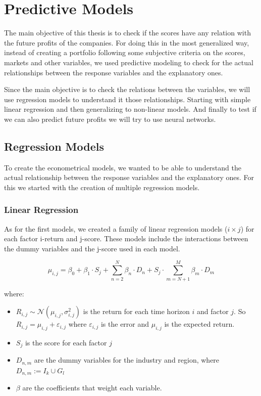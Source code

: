 \documentclass[11pt,english,a4paper,hidelinks]{book}
\begin{document}
\section{Predictive Models}
The main objective of this thesis is to check if the scores have any relation with the future profits of the companies. For doing this in the most generalized way, instead of creating a portfolio following some subjective criteria on the scores, markets and other variables, we used predictive modeling to check for the actual relationships between the response variables and the explanatory ones.

\vspace{0.5cm}
\noindent Since the main objective is to check the relations between the variables, we will use regression models to understand it those relationships. Starting with simple linear regression and then generalizing to non-linear models. And finally to test if we can also predict future profits we will try to use neural networks.


\subsection{Regression Models}

To create the econometrical models, we wanted to be able to understand the actual relationship between the response variables and the explanatory ones. For this we started with the creation of multiple regression models.

\subsubsection{Linear Regression}

As for the first models, we created a family of linear regression models (\(i \times j\)) for each factor i-return and j-score. These models include the interactions between the dummy variables and the j-score used in each model.

\begin{equation}
    \mu_{i,j} = \beta_0+\beta_1 \cdot S_j + 
\sum_{n=2}^{N}\beta_{n}\cdot D_n + S_j \cdot \sum_{m=N+1}^{M}\beta_{m}\cdot D_m
\end{equation}

\noindent where:
\begin{itemize}
    \item  \(R_{i,j} \sim \mathcal{N}(\mu_{i,j}, \sigma_{i,j}^2)\) is the return for each time horizon \(i\) and factor \(j\). So \(R_{i,j} = \mu_{i,j} + \varepsilon_{i,j}\) where \(\varepsilon_{i,j}\) is the error and \(\mu_{i,j}\) is the expected return.
    \item \(S_j\) is the score for each factor \(j\)
    \item \(D_{n,m}\) are the dummy variables for the industry and region, where \(D_{n,m} := I_k \cup G_l\)
    \item \(\beta\) are the coefficients that weight each variable.
\end{itemize}
\end{document}
